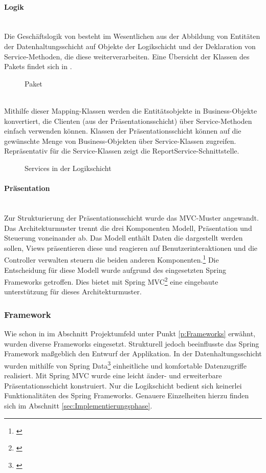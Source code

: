 \paragraph{Logik} ~\\
\label{p:Logik}
Die Geschäftslogik von \projektName besteht im Wesentlichen aus der Abbildung von Entitäten der Datenhaltungsschicht auf Objekte der Logikschicht und der Deklaration von Service-Methoden, die diese weiterverarbeiten. Eine Übersicht der Klassen des Pakets  findet sich in .
\begin{figure}[htb]
	\centering
	\caption{Paket }
	\label{fig:Mapping}
\end{figure}\\
Mithilfe dieser Mapping-Klassen werden die Entitätsobjekte in Business-Objekte konvertiert, die Clienten (aus der Präsentationsschicht) über Service-Methoden einfach verwenden können. Klassen der Präsentationsschicht können auf die gewünschte Menge von Business-Objekten über Service-Klassen zugreifen. Repräsentativ für die Service-Klassen zeigt  die ReportService-Schnittstelle.
\begin{figure}[htb]
	\centering
	\caption{Services in der Logikschicht}
	\label{fig:Logik}
\end{figure}

\paragraph{Präsentation} ~\\
\label{p:Praesentation}
Zur Strukturierung der Präsentationsschicht wurde das \ac{MVC}-Muster angewandt. Das Architekturmuster trennt die drei Komponenten Modell, Präsentation und Steuerung voneinander ab. Das Modell enthält Daten die dargestellt werden sollen, Views präsentieren diese und reagieren auf Benutzerinteraktionen und die Controller verwalten \bzw steuern die beiden anderen Komponenten.\footnote{\Vgl \cite{wiki:mvc}}
Die Entscheidung für diese Modell wurde aufgrund des eingesetzten Spring Frameworks getroffen. Dies bietet mit Spring MVC\footnote{\Vgl \cite{spring:mvc}} eine eingebaute unterstützung für dieses Architekturmuster.

\subsubsection{Framework}
\label{sec:Framework}
Wie schon in im Abschnitt Projektumfeld unter Punkt \ref{p:Frameworks} erwähnt, wurden diverse Frameworks eingesetzt. Strukturell jedoch beeinflusste das Spring Framework maßgeblich den Entwurf der Applikation. In der Datenhaltungsschicht wurden mithilfe von Spring Data\footnote{\Vgl \cite{spring:data}} einheitliche und komfortable Datenzugriffe realisiert. Mit Spring MVC wurde eine leicht änder- und erweiterbare Präsentationsschicht konstruiert. Nur die Logikschicht bedient sich keinerlei Funktionalitäten des Spring Frameworks. Genauere Einzelheiten hierzu finden sich im Abschnitt \ref{sec:Implementierungsphase}.

